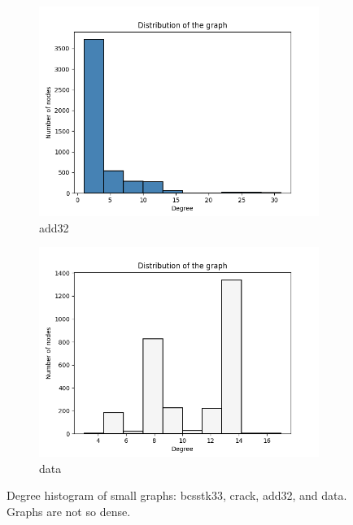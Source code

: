 \begin{figure}[h!]
\begin{subfigure}[b]{.35\textwidth}
  \centering
  \includegraphics[width=\linewidth]{small_graphs/add32.png}  
  \caption{add32}
  \label{fig:sub-third}
\end{subfigure}
\begin{subfigure}[b]{.35\textwidth}
  \centering
  \includegraphics[width=\linewidth]{small_graphs/data.png}  
  \caption{data}
  \label{fig:sub-fourth}
\end{subfigure}
\caption{Degree histogram of small graphs: bcsstk33, crack, add32, and data. Graphs are not so dense.}
\label{fig:fig}
\end{figure}

